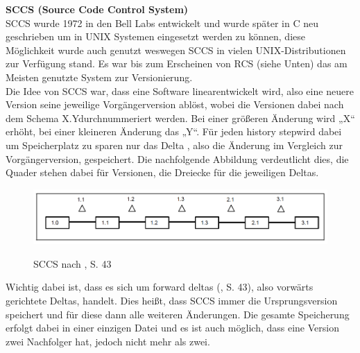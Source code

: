 \textbf{SCCS (Source Code Control System)}
\\
\acs{SCCS} wurde 1972 in den Bell Labs entwickelt und wurde später in C neu geschrieben um in UNIX Systemen eingesetzt werden zu können, diese Möglichkeit wurde auch genutzt weswegen SCCS in vielen UNIX-Distributionen zur Verfügung stand. Es war bis zum Erscheinen von RCS (siehe Unten) das am Meisten genutzte System zur Versionierung. 
\\
Die Idee von SCCS war, dass eine Software \Gu linear\Go entwickelt wird, also eine neuere Version seine jeweilige Vorgängerversion ablöst, wobei die Versionen dabei nach dem Schema \Gu X.Y\Go durchnummeriert werden. Bei einer größeren Änderung wird „X“ erhöht, bei einer kleineren Änderung das „Y“. Für jeden \Gu history step\Go wird dabei um Speicherplatz zu sparen nur das \Gu Delta \Go, also die Änderung im Vergleich zur Vorgängerversion, gespeichert. Die nachfolgende Abbildung verdeutlicht dies, die Quader stehen dabei für Versionen, die Dreiecke für die jeweiligen Deltas.
\begin{figure}[H]
	\includegraphics[width=\textwidth]{img/vcm1.png}
	\label{fig:vcm1}
	\caption{ SCCS nach \cite{cm_vc}, S. 43}
\end{figure}

Wichtig dabei ist, dass es sich um \Gu forward deltas \Go (\cite{cm_vc}, S. 43), also vorwärts gerichtete Deltas, handelt. Dies heißt, dass SCCS immer die Ursprungsversion speichert und für diese dann alle weiteren Änderungen. Die gesamte Speicherung erfolgt dabei in einer einzigen Datei und es ist auch möglich, dass eine Version zwei Nachfolger hat, jedoch nicht mehr als zwei. \cite{cm_vc}

